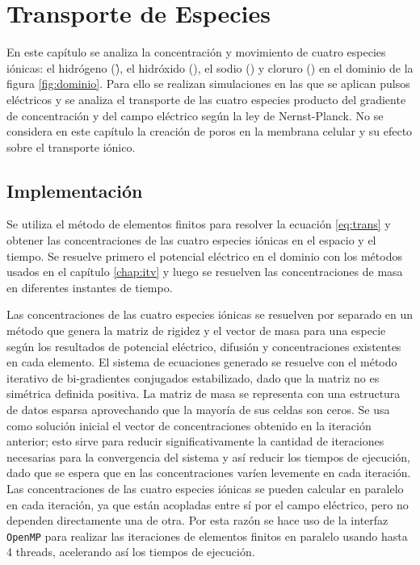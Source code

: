 \chapter{Transporte de Especies} \label{chap:trans}

En este capítulo se analiza la concentración y movimiento de cuatro especies iónicas: el hidrógeno (\h), el hidróxido (\oh), el sodio (\na) y cloruro (\cl) en el dominio de la figura \ref{fig:dominio}. Para ello se realizan simulaciones en las que se aplican pulsos eléctricos y se analiza el transporte de las cuatro especies producto del gradiente de concentración y del campo eléctrico según la ley de Nernst-Planck. No se considera en este capítulo la creación de poros en la membrana celular y su efecto sobre el transporte iónico.

\section{Implementación}

Se utiliza el método de elementos finitos para resolver la ecuación \ref{eq:trans} y obtener las concentraciones de las cuatro especies iónicas en el espacio y el tiempo. Se resuelve primero el potencial eléctrico en el dominio con los métodos usados en el capítulo \ref{chap:itv} y luego se resuelven las concentraciones de masa en diferentes instantes de tiempo.

Las concentraciones de las cuatro especies iónicas se resuelven por separado en un método que genera la matriz de rigidez y el vector de masa para una especie según los resultados de potencial eléctrico, difusión y concentraciones existentes en cada elemento. El sistema de ecuaciones generado se resuelve con el método iterativo de bi-gradientes conjugados estabilizado, dado que la matriz no es simétrica definida positiva. La matriz de masa se representa con una estructura de datos esparsa aprovechando que la mayoría de sus celdas son ceros. Se usa como solución inicial el vector de concentraciones obtenido en la iteración anterior; esto sirve para reducir significativamente la cantidad de iteraciones necesarias para la convergencia del sistema y así reducir los tiempos de ejecución, dado que se espera que en las concentraciones varíen levemente en cada iteración. Las concentraciones de las cuatro especies iónicas se pueden calcular en paralelo en cada iteración, ya que están acopladas entre sí por el campo eléctrico, pero no dependen directamente una de otra. Por esta razón se hace uso de la interfaz \texttt{OpenMP} para realizar las iteraciones de elementos finitos en paralelo usando hasta 4 threads, acelerando así los tiempos de ejecución.

